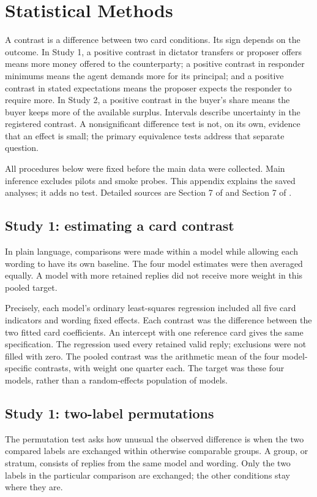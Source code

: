 \section{Statistical Methods}
\label{app:methods}
A contrast is a difference between two card conditions. Its sign depends on the outcome. In Study 1, a positive contrast in dictator transfers or proposer offers means more money offered to the counterparty; a positive contrast in responder minimums means the agent demands more for its principal; and a positive contrast in stated expectations means the proposer expects the responder to require more. In Study 2, a positive contrast in the buyer's share means the buyer keeps more of the available surplus. Intervals describe uncertainty in the registered contrast. A nonsignificant difference test is not, on its own, evidence that an effect is small; the primary equivalence tests address that separate question.

All procedures below were fixed before the main data were collected. Main inference excludes pilots and smoke probes. This appendix explains the saved analyses; it adds no test. Detailed sources are Section 7 of  and Section 7 of .

\subsection{Study 1: estimating a card contrast}
\label{subapp:study-1-estimating-a-card-contrast}
In plain language, comparisons were made within a model while allowing each wording to have its own baseline. The four model estimates were then averaged equally. A model with more retained replies did not receive more weight in this pooled target.

Precisely, each model's ordinary least-squares regression included all five card indicators and wording fixed effects. Each contrast was the difference between the two fitted card coefficients. An intercept with one reference card gives the same specification. The regression used every retained valid reply; exclusions were not filled with zero. The pooled contrast was the arithmetic mean of the four model-specific contrasts, with weight one quarter each. The target was these four models, rather than a random-effects population of models.

\subsection{Study 1: two-label permutations}
\label{subapp:study-1-two-label-permutations}
The permutation test asks how unusual the observed difference is when the two compared labels are exchanged within otherwise comparable groups. A group, or stratum, consists of replies from the same model and wording. Only the two labels in the particular comparison are exchanged; the other conditions stay where they are.

